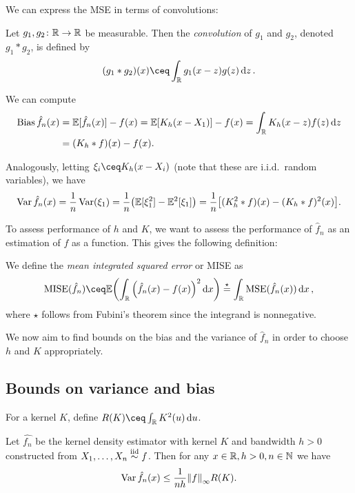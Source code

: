 We can express the MSE in terms of convolutions: 
\begin{definition}
	Let $g_1, g_2 \colon \mathbb R \to \mathbb R$ be measurable. Then the \emph{convolution} of $g_1$ and $g_2$, denoted $g_1 * g_2$, is defined by
	\[
	(g_1 * g_2)(x) \ceq \int_\RR g_1(x - z) g(z) \dd{z}. 
	\]
\end{definition}
We can compute 
\begin{align}
\operatorname{Bias} \hat f_n(x) &= \mathbb E[\hat f_n(x)] - f(x) = \mathbb E[K_h(x - X_1)] - f(x) = \int_\mathbb R  K_h(x - z) f(z) \dd{z} \nonumber \\
&= (K_h * f)(x) - f(x) \label{eq:bias_computation}. 
\end{align}

Analogously, letting $\xi_i \ceq K_h(x - X_i)$ (note that these are i.i.d.\ random variables), we have
\begin{equation} \label{eq:variance_computation}
	\operatorname{Var} \hat f_n(x) = \frac1n \operatorname{Var}(\xi_1) = \frac1n \qty(\mathbb E[\xi_1^2] - \mathbb E^2[\xi_1]) = \frac1n \qty[(K_h^2 * f)(x) - (K_h * f)^2(x)].
\end{equation}

To assess performance of $h$ and $K$, we want to assess the performance of $\hat f_n$ as an estimation of $f$ as a function. This gives the following definition:
\begin{definition}
	We define the \emph{mean integrated squared error} or MISE as\[
	\MISE(\hat f_n) \ceq \EE\qty(\int_\RR \qty(\hat f_n(x) - f(x))^2 \dd{x}) \overset\star= \int_\RR \MSE(\hat f_n(x)) \dd{x}, 
	\]
	where $\star$ follows from Fubini's theorem since the integrand is nonnegative. 
\end{definition}

We now aim to find bounds on the bias and the variance of $\hat f_n$ in order to choose $h$ and $K$ appropriately.

\subsection{Bounds on variance and bias}
\begin{definition}
	For a kernel $K$, define $R(K) \ceq \int_\RR K^2(u) \dd{u}$. 
\end{definition}

\begin{proposition} \label{prop:variance_bound}
	Let $\hat{f_n}$ be the kernel density estimator with kernel $K$ and bandwidth $h > 0$ constructed from $X_1, \dotsc, X_n \overset{\mathrm{iid}}{\sim} f$. Then for any $x \in \mathbb R, h > 0, n \in \mathbb N$ we have
	\[
	\operatorname{Var} \hat f_n(x) \leq \frac{1}{nh} \norm{f}_\infty R(K). 
	\]
\end{proposition}

